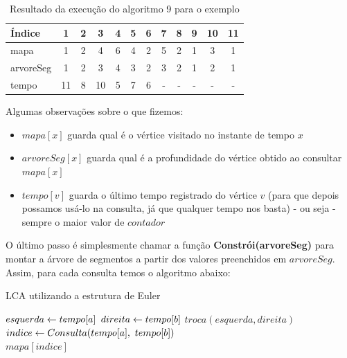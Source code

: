 \begin{table}[htb]
\centering
\begin{tabular}{|l|c|c|c|c|c|c|c|c|c|c|c|}
\hline
Índice      &  1 & 2 &  3 & 4 & 5 & 6 & 7 & 8 & 9 & 10 & 11 \\ \hline
mapa        &  1 & 2 &  4 & 6 & 4 & 2 & 5 & 2 & 1 &  3 &  1 \\ \hline
arvoreSeg   &  1 & 2 &  3 & 4 & 3 & 2 & 3 & 2 & 1 &  2 &  1 \\ \hline
tempo       & 11 & 8 & 10 & 5 & 7 & 6 & - & - & - &  - &  - \\ \hline

\end{tabular}
\caption{Resultado da execução do algoritmo 9 para o exemplo}
\end{table}

Algumas observações sobre o que fizemos:

\begin{itemize}
    \item $mapa[x]$ guarda qual é o vértice visitado no instante de tempo $x$
    \item $arvoreSeg[x]$ guarda qual é a profundidade do vértice obtido ao consultar $mapa[x]$
    \item $tempo[v]$ guarda o último tempo registrado do vértice $v$ (para que depois possamos usá-lo na consulta, já que qualquer tempo nos basta) - ou seja - sempre o maior valor de $contador$
\end{itemize}

\vspace{0.5cm}

O último passo é simplesmente chamar a função \textbf{Constrói(arvoreSeg)} para montar a árvore de segmentos a partir dos valores preenchidos em $arvoreSeg$. Assim, para cada consulta temos o algoritmo abaixo:

\begin{algorithm}[H]
\caption{LCA utilizando a estrutura de Euler}
\begin{algorithmic}[1]
    \State $esquerda \leftarrow tempo[a]$
    \State $direita \leftarrow tempo[b]$
        \State $troca(esquerda, direita)$
    \EndIf
    \State $indice \rec Consulta(tempo[a],\ tempo[b])$
    \\\hspace{5mm} \Return $mapa[indice]$
\EndFunction
\end{algorithmic}
\end{algorithm}

